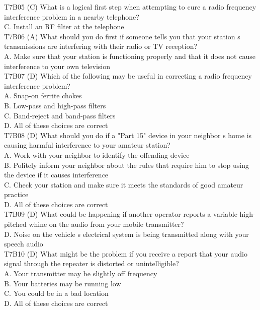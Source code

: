 \documentclass[12pt,letterpaper]{report}
\begin{document}
T7B05 (C) What is a logical first step when attempting to cure a radio frequency interference problem in a nearby telephone?\\
C. Install an RF filter at the telephone\\

T7B06 (A) What should you do first if someone tells you that your station s transmissions are interfering with their radio or TV reception?\\
A. Make sure that your station is functioning properly and that it does not cause interference to your own television\\

T7B07 (D) Which of the following may be useful in correcting a radio frequency interference problem?\\
A. Snap-on ferrite chokes\\
B. Low-pass and high-pass filters\\
C. Band-reject and band-pass filters\\
D. All of these choices are correct\\

T7B08 (D) What should you do if a "Part 15" device in your neighbor s home is causing harmful interference to your amateur station?\\
A. Work with your neighbor to identify the offending device\\
B. Politely inform your neighbor about the rules that require him to stop using the device if it causes interference\\
C. Check your station and make sure it meets the standards of good amateur practice\\
D. All of these choices are correct\\

T7B09 (D) What could be happening if another operator reports a variable high-pitched whine on the audio from your mobile transmitter?\\
D. Noise on the vehicle s electrical system is being transmitted along with your speech audio\\

T7B10 (D) What might be the problem if you receive a report that your audio signal through the repeater is distorted or unintelligible?\\
A. Your transmitter may be slightly off frequency\\
B. Your batteries may be running low\\
C. You could be in a bad location\\
D. All of these choices are correct\\
\end{document}
